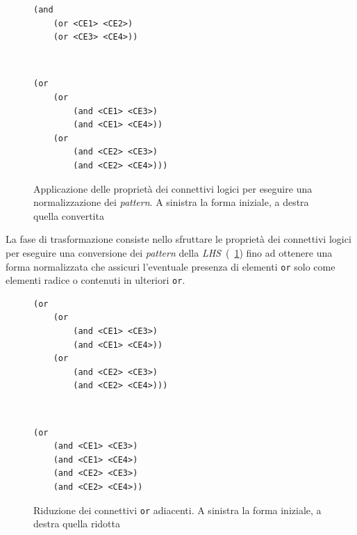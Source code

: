 \begin{figure}[h]
\centering
\begin{minipage}[t]{5.5cm}
\begin{lstlisting}[numbers=none]
(and
	(or <CE1> <CE2>)
	(or <CE3> <CE4>))
\end{lstlisting}
\end{minipage}
\ \hspace{2mm} \hspace{3mm} \
\begin{minipage}[t]{5.5cm}
\begin{lstlisting}[numbers=none]
(or	
	(or
		(and <CE1> <CE3>)
		(and <CE1> <CE4>))
	(or
		(and <CE2> <CE3>)
		(and <CE2> <CE4>)))
\end{lstlisting}
\end{minipage}
\caption[Applicazione delle proprietà dei connettivi logici]{Applicazione delle proprietà dei connettivi logici per eseguire una normalizzazione dei \emph{pattern}. A sinistra la forma iniziale, a destra quella convertita}\label{fig:esempio-normalizzazione}
\end{figure}

La fase di trasformazione consiste nello sfruttare le proprietà dei connettivi logici per eseguire una conversione dei \emph{pattern} della \emph{LHS}~(\figurename~\ref{fig:esempio-normalizzazione}) fino ad ottenere una forma normalizzata che assicuri l'eventuale presenza di elementi \texttt{or} solo come elementi radice o contenuti in ulteriori \texttt{or}.

\begin{figure}[h]
\centering
\begin{minipage}[t]{5.5cm}
\begin{lstlisting}[numbers=none]
(or	
	(or
		(and <CE1> <CE3>)
		(and <CE1> <CE4>))
	(or
		(and <CE2> <CE3>)
		(and <CE2> <CE4>)))
\end{lstlisting}
\end{minipage}
\ \hspace{2mm} \hspace{3mm} \
\begin{minipage}[t]{5.5cm}
\begin{lstlisting}[numbers=none]
(or	
	(and <CE1> <CE3>)
	(and <CE1> <CE4>)
	(and <CE2> <CE3>)
	(and <CE2> <CE4>))
\end{lstlisting}
\end{minipage}
\caption[Riduzione dei connettivi \texttt{or} adiacenti]{Riduzione dei connettivi \texttt{or} adiacenti. A sinistra la forma iniziale, a destra quella ridotta}\label{fig:esempio-riduzione}
\end{figure}


